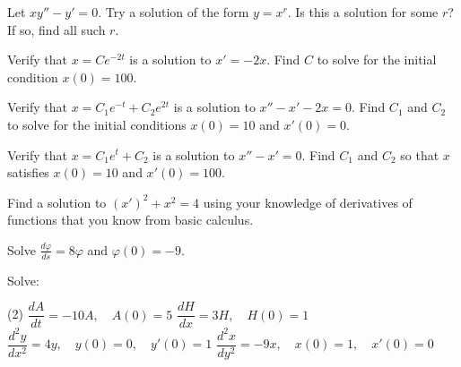 \documentclass{ximera}
\begin{document}
\begin{exercise}%
Let $xy'' - y' = 0$.  Try a solution of the form $y = x^r$.  Is this a
solution for some $r$?  If so, find all such $r$.
\end{exercise}

\begin{exercise}
    Verify that $x = C e^{-2t}$ is a solution to $x' = -2x$. Find $C$ to solve for the initial condition $x(0) = 100$.
\end{exercise}

\begin{exercise}
    Verify that $x = C_1 e^{-t} + C_2 e^{2t}$ is a solution to $x'' - x' -2 x = 0$.  Find $C_1$ and $C_2$ to solve for the initial conditions $x(0) = 10$ and $x'(0) = 0$.
\end{exercise}

\begin{exercise}%
    Verify that $x=C_1e^t+C_2$ is a solution to $x''-x' = 0$.  Find $C_1$ and $C_2$ so that $x$ satisfies $x(0) = 10$ and $x'(0) = 100$.
\end{exercise}

\begin{exercise}
    Find a solution to ${(x')}^2 + x^2 = 4$ using your knowledge of derivatives of functions that you know from basic calculus.
\end{exercise}

\begin{exercise}%
    Solve $\frac{d\varphi}{ds} = 8 \varphi$ and $\varphi(0) = -9$.
\end{exercise}

\begin{exercise}
    Solve:
    \begin{tasks}(2)
        \task $\dfrac{dA}{dt} = -10 A, \quad A(0)=5$
        \task $\dfrac{dH}{dx} = 3 H, \quad H(0)=1$
        \task $\dfrac{d^2y}{dx^2} = 4 y, \quad y(0)=0, \quad y'(0)=1$
        \task $\dfrac{d^2x}{dy^2} = -9 x, \quad x(0)=1, \quad x'(0)=0$
    \end{tasks}
\end{exercise}
\end{document}
